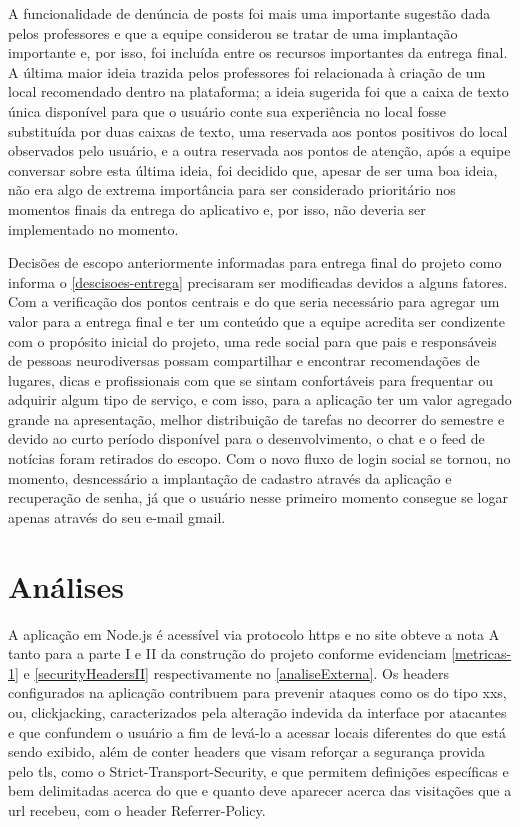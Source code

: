 A funcionalidade de denúncia de posts foi mais uma importante sugestão dada pelos professores e que a equipe considerou se tratar de uma implantação importante e, por isso, foi incluída entre os recursos importantes da entrega final. A última maior ideia trazida pelos professores foi relacionada à criação de um local recomendado dentro na plataforma; a ideia sugerida foi que a caixa de texto única disponível para que o usuário conte sua experiência no local fosse substituída por duas caixas de texto, uma reservada aos pontos positivos do local observados pelo usuário, e a outra reservada aos pontos de atenção, após a equipe conversar sobre esta última ideia, foi decidido que, apesar de ser uma boa ideia, não era algo de extrema importância para ser considerado prioritário nos momentos finais da entrega do aplicativo e, por isso, não deveria ser implementado no momento.

Decisões de escopo anteriormente informadas para entrega final do projeto como informa o \autoref{descisoes-entrega} precisaram ser modificadas devidos a alguns fatores. Com a verificação dos pontos centrais e do que seria necessário para agregar um valor para a entrega final e ter um conteúdo que a equipe acredita ser condizente com o propósito inicial do projeto, uma rede social para que pais e responsáveis de pessoas neurodiversas possam compartilhar e encontrar recomendações de lugares, dicas e profissionais com que se sintam confortáveis para frequentar ou adquirir algum tipo de serviço, e com isso, para a aplicação ter um valor agregado grande na apresentação, melhor distribuição de tarefas no decorrer do semestre e devido ao curto período disponível para o desenvolvimento, o chat e o feed de notícias foram retirados do escopo. Com o novo fluxo de login social se tornou, no momento, desncessário a implantação de cadastro através da aplicação e recuperação de senha, já que o usuário nesse primeiro momento consegue se logar apenas através do seu e-mail gmail. 
 
\section{Análises}

A aplicação em Node.js é acessível via protocolo \ac{https} e no site   obteve a nota A tanto para a parte I e II da construção do projeto conforme evidenciam \autoref{metricas-1} e \autoref{securityHeadersII} respectivamente no \autoref{analiseExterna}. Os headers configurados na aplicação contribuem para prevenir ataques como os do tipo \ac{xxs}, ou, clickjacking,  caracterizados pela alteração indevida da interface por atacantes e que confundem o usuário a fim de levá-lo a acessar locais diferentes do que está sendo exibido, além de conter headers que visam reforçar a segurança provida pelo \ac{tls}, como o Strict-Transport-Security, e que permitem definições específicas e bem delimitadas acerca do que e quanto deve aparecer acerca das visitações que a \ac{url} recebeu, com o header Referrer-Policy. 




